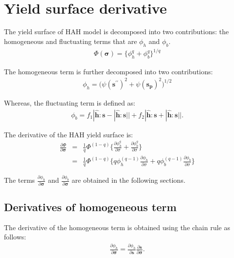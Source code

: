 \documentclass[12pt]{amsart}
\begin{document}
\section{Yield surface derivative}
The yield surface of HAH model is decomposed into two contributions: the homogeneous and fluctuating terms that are $\phi_h$ and $\phi_b$.
\begin{eqnarray}
  \label{eq:hah_def}
  \Phi(\mathbf{\sigma})=\{\phi_h^q + \phi_b^q \}^{1/q}
\end{eqnarray}

The homogeneous term is further decomposed into two contributions:
\begin{eqnarray}
  \label{eq:hah_homo}
  \phi_h = \big(\psi(\mathbf{s}^{\prime\prime})^2+\psi(\mathbf{s_p})^2\big)^{1/2}
\end{eqnarray}

Whereas, the fluctuating term is defined as:
\begin{eqnarray}
    \label{eq:fluc}
\phi_b  = f_1|\hat{\mathbf{h}}:\mathbf{s} - |\hat{\mathbf{h}}:\mathbf{s}||    + f_2|\hat{\mathbf{h}}:\mathbf{s} + |\hat{\mathbf{h}}:\mathbf{s}||.
\end{eqnarray}

The derivative of the HAH yield surface is:
\begin{eqnarray}
  \label{eq:hah_deriv}
  \frac{\partial\Phi}{\partial\mathbf{\sigma}} &=&\frac{1}{q}\Phi^{(1-q)} \bigg\{                  \frac{\partial{\phi_h^q}}{\partial{\sigma}}  +                 \frac{\partial{\phi_b^q}}{\partial{\sigma}}         \bigg\}\\
                                               &=&\frac{1}{q}\Phi^{(1-q)} \bigg\{  q \phi_h^{(q-1)}\frac{\partial{\phi_h}  }{\partial{\sigma}}  + q \phi_b^{(q-1)}\frac{\partial{\phi_b}  }{\partial{\sigma}}         \bigg\}
\end{eqnarray}

The terms $\frac{\partial{\phi_h}  }{\partial{\mathbf{\sigma}}}$ and $\frac{\partial{\phi_b}  }{\partial{\mathbf{\sigma}}}$ are obtained in the following sections.



\subsection{Derivatives of homogeneous term}
\label{sec:2.1}

The derivative of the homogeneous term is obtained using the chain rule as follows:
\begin{eqnarray}
  \label{eq:derv1}
  \frac{\partial{\phi_h}  }{\partial{\mathbf{\sigma}}}  =   \frac{\partial{\phi_h}}{\partial{\mathbf{s}}} \frac{\partial{\mathbf{s}}}{\partial{\mathbf{\sigma}}}.
\end{eqnarray}
\end{document}
